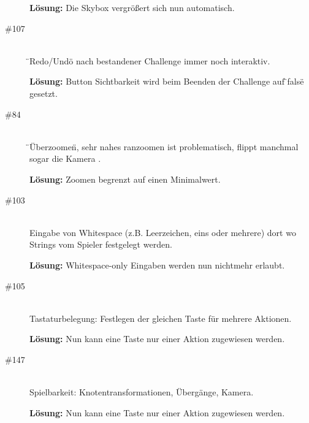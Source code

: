 \begin{description}
{\bfseries Lösung:} Die Skybox vergrößert sich nun automatisch.

\item[\#107] \hfill \\

\"{}Redo/Undo\"{} nach bestandener Challenge immer noch interaktiv. 

{\bfseries Lösung:} Button Sichtbarkeit wird beim Beenden der Challenge auf 
\"{}false\"{} gesetzt.


\item[\#84] \hfill \\

\"{}Überzoomen\"{}, sehr nahes ranzoomen ist problematisch, flippt manchmal sogar die Kamera .

{\bfseries Lösung:} Zoomen begrenzt auf einen Minimalwert.


\item[\#103] \hfill \\
Eingabe von Whitespace (z.B. Leerzeichen, eins oder mehrere) dort wo Strings vom Spieler festgelegt werden. 

{\bfseries Lösung:} Whitespace-only Eingaben werden nun nichtmehr erlaubt.

\item[\#105] \hfill \\
Tastaturbelegung: Festlegen der gleichen Taste für mehrere Aktionen. 

{\bfseries Lösung:} Nun kann eine Taste nur einer Aktion zugewiesen werden.


\item[\#147] \hfill \\
Spielbarkeit: Knotentransformationen, Übergänge, Kamera. 

{\bfseries Lösung:} Nun kann eine Taste nur einer Aktion zugewiesen werden.


\end{description}


